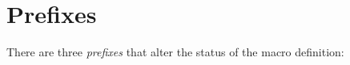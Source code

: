 \documentclass[letterpaper]{book}
\begin{document}
\section{Prefixes}

There are three \emph{prefixes}
that alter the status of the
macro definition:
\end{document}

